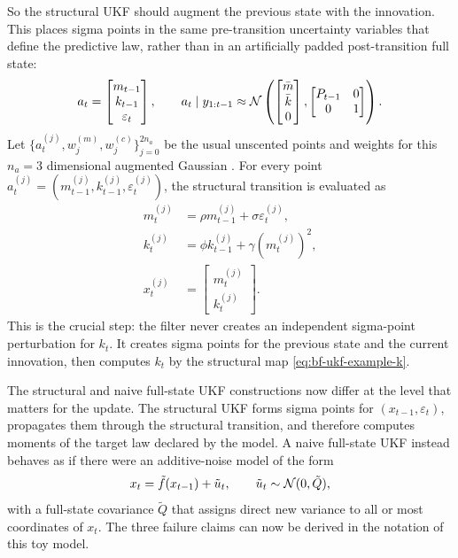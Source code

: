So the structural UKF should augment the previous state with the innovation.
This places sigma points in the same pre-transition uncertainty variables that
define the predictive law, rather than in an artificially padded post-transition
full state:
\begin{equation}
  a_t =
  \begin{bmatrix}
    m_{t-1}\\ k_{t-1}\\ \varepsilon_t
  \end{bmatrix},
  \qquad
  a_t\mid y_{1:t-1}
  \approx
  \mathcal{N}\left(
    \begin{bmatrix}\bar m\\ \bar k\\ 0\end{bmatrix},
    \begin{bmatrix}
      P_{t-1} & 0\\
      0 & 1
    \end{bmatrix}
  \right).
  \label{eq:bf-ukf-augmented-law}
\end{equation}
Let $\{a_t^{(j)},w_j^{(m)},w_j^{(c)}\}_{j=0}^{2n_a}$ be the usual unscented
points and weights for this $n_a=3$ dimensional augmented Gaussian
\citep{julier1997new}.  For every point
$a_t^{(j)}=(m_{t-1}^{(j)},k_{t-1}^{(j)},\varepsilon_t^{(j)})$, the structural
transition is evaluated as
\begin{align}
  m_t^{(j)}
    &= \rho m_{t-1}^{(j)}+\sigma\varepsilon_t^{(j)},\\
  k_t^{(j)}
    &= \phi k_{t-1}^{(j)}+\gamma\left(m_t^{(j)}\right)^2,\\
  x_t^{(j)}
    &= \begin{bmatrix}m_t^{(j)}\\ k_t^{(j)}\end{bmatrix}.
\end{align}
This is the crucial step: the filter never creates an independent sigma-point
perturbation for $k_t$.  It creates sigma points for the previous state and
the current innovation, then computes $k_t$ by the structural map
\eqref{eq:bf-ukf-example-k}.

The structural and naive full-state UKF constructions now differ at the level
that matters for the update.  The structural UKF forms sigma points for
$(x_{t-1},\varepsilon_t)$, propagates them through the structural transition,
and therefore computes moments of the target law declared by the model.  A
naive full-state UKF instead behaves as if there were an additive-noise model
of the form
\[
  x_t = \tilde f(x_{t-1}) + \tilde u_t,
  \qquad
  \tilde u_t \sim \mathcal{N}(0,\tilde Q),
\]
with a full-state covariance $\tilde Q$ that assigns direct new variance to all
or most coordinates of $x_t$.  The three failure claims can now be derived in
the notation of this toy model.

